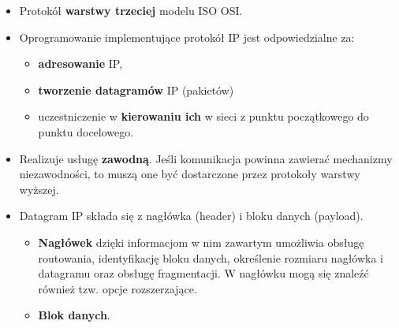 \documentclass[../main.tex]{subfiles}
\begin{document}
    \begin{itemize}
        \item Protokół \textbf{warstwy trzeciej} modelu ISO OSI.
        \item Oprogramowanie implementujące protokół IP jest odpowiedzialne za:
        \begin{itemize}
            \item \textbf{adresowanie} IP,
            \item \textbf{tworzenie datagramów} IP (pakietów)
            \item uczestniczenie w \textbf{kierowaniu ich} w sieci z punktu początkowego do punktu docelowego.
        \end{itemize}
        \item Realizuje usługę \textbf{zawodną}. Jeśli komunikacja powinna zawierać mechanizmy niezawodności, to muszą one być dostarczone przez protokoły warstwy wyższej.
        \item Datagram IP składa się z nagłówka (header) i bloku danych (payload).
        \begin{itemize}
            \item \textbf{Nagłówek} dzięki informacjom w nim zawartym umożliwia obsługę routowania, identyfikację bloku danych, określenie rozmiaru nagłówka i datagramu oraz obsługę fragmentacji. W nagłówku mogą się znaleźć również tzw. opcje rozszerzające.
            \item \textbf{Blok danych}.
        \end{itemize}
    \end{itemize}
\end{document}
